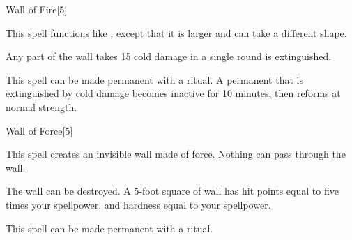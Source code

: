 \begin{spellsection}[Greater]{Wall of Fire}[5]
    \begin{spellheader}
    \end{spellheader}
    \begin{spellcontent}
        \begin{spelltargetinginfo}
        \end{spelltargetinginfo}
        \begin{spelleffects}
            \spellspecial This spell functions like , except that it is larger and can take a different shape.
            \spelldur \durshort
        \end{spelleffects}
    \end{spellcontent}
    \begin{spellfooter}
        \spellnotes Any part of the wall takes 15 cold damage in a single round is extinguished.

        This spell can be made permanent with a  ritual. A permanent  that is extinguished by cold damage becomes inactive for 10 minutes, then reforms at normal strength.
        \miscastexplode
    \end{spellfooter}
\end{spellsection}

\begin{spellsection}{Wall of Force}[5]
    \begin{spellheader}
    \end{spellheader}
    \begin{spellcontent}
        \begin{spelltargetinginfo}
        \end{spelltargetinginfo}
        \begin{spelleffects}
            \spelleffect This spell creates an invisible wall made of force. Nothing can pass through the wall.
            \spelldur \durshort \dismissable
        \end{spelleffects}
    \end{spellcontent}
    \begin{spellfooter}
        \spellnotes The wall can be destroyed. A 5-foot square of wall has hit points equal to five times your spellpower, and hardness equal to your spellpower.

        \forcespellnotes

        This spell can be made permanent with a  ritual.
        \miscastexplode
    \end{spellfooter}
\end{spellsection}

